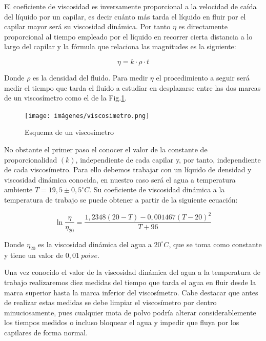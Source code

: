 \documentclass[a4paper,12pt,titlepage]{report}
\begin{document}
\par El coeficiente de viscosidad es inversamente proporcional a la velocidad de caída del líquido por un capilar, es decir cuánto más tarda el líquido en fluir por el capilar mayor será su viscosidad dinámica. Por tanto $\eta$ es directamente proporcional al tiempo empleado por el líquido en recorrer cierta distancia a lo largo del capilar y la fórmula que relaciona las magnitudes es la siguiente:

\begin{equation}
    \eta = k \cdot  \rho \cdot t
    \label{Viscosidad 1}
\end{equation}

Donde $\rho$ es la densidad del fluido. Para medir $\eta$ el procedimiento a seguir será medir el tiempo que tarda el fluido a estudiar en desplazarse entre las dos marcas de un viscosímetro como el de la Fig.\ref{Viscosímetro}.

\begin{figure}[h!]
    \centering
    \texttt{[image: imágenes/viscosimetro.png]}

    \caption{Esquema de un viscosímetro}
    \label{Viscosímetro}
\end{figure}

No obstante el primer paso el conocer el valor de la constante de proporcionalidad $(k)$, independiente de cada capilar y, por tanto, independiente de cada viscosímetro. Para ello debemos trabajar con un líquido de densidad y viscosidad dinámica conocida, en nuestro caso será el agua a temperatura ambiente $T= 19,5\pm 0,5^{\circ} C$. Su coeficiente de viscosidad dinámica a la temperatura de trabajo se puede obtener a partir de la siguiente ecuación:

\begin{equation}
    \ln \frac{\eta}{\eta_{20}} = \frac{1,2348(20-T)-0,001467(T-20)^2}{T+96}
    \label{Coeficientes viscosidad}
\end{equation}

Donde $\eta_{20}$ es la viscosidad dinámica del agua a $20^{\circ}C$, que se toma como constante y tiene un valor de $0,01\: poise$.

\par Una vez conocido el valor de la viscosidad dinámica del agua a la temperatura de trabajo realizaremos diez medidas del tiempo que tarda el agua en fluir desde la marca superior hasta la marca inferior del viscosímetro. Cabe destacar que antes de realizar estas medidas se debe limpiar el viscosímetro por dentro minuciosamente, pues cualquier mota de polvo podría alterar considerablemente los tiempos medidos o incluso bloquear el agua y impedir que fluya por los capilares de forma normal.
\end{document}
